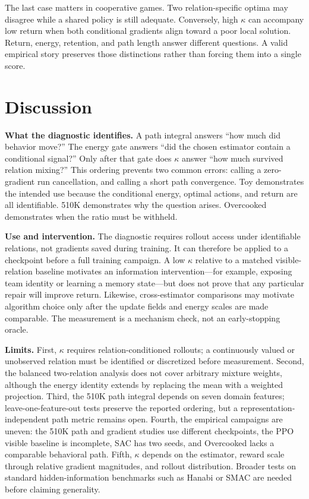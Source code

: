 \documentclass[letterpaper]{article}
\begin{document}
The last case matters in cooperative games.
Two relation-specific optima may disagree while a shared policy is still adequate.
Conversely, high $\kappa$ can accompany low return when both conditional gradients align toward a poor local solution.
Return, energy, retention, and path length answer different questions.
A valid empirical story preserves those distinctions rather than forcing them into a single score.


\section{Discussion}

\textbf{What the diagnostic identifies.}
A path integral answers ``how much did behavior move?''
The energy gate answers ``did the chosen estimator contain a conditional signal?''
Only after that gate does $\kappa$ answer ``how much survived relation mixing?''
This ordering prevents two common errors: calling a zero-gradient run cancellation, and calling a short path convergence.
Toy demonstrates the intended use because the conditional energy, optimal actions, and return are all identifiable.
510K demonstrates why the question arises.
Overcooked demonstrates when the ratio must be withheld.

\textbf{Use and intervention.}
The diagnostic requires rollout access under identifiable relations, not gradients saved during training.
It can therefore be applied to a checkpoint before a full training campaign.
A low $\kappa$ relative to a matched visible-relation baseline motivates an information intervention---for example, exposing team identity or learning a memory state---but does not prove that any particular repair will improve return.
Likewise, cross-estimator comparisons may motivate algorithm choice only after the update fields and energy scales are made comparable.
The measurement is a mechanism check, not an early-stopping oracle.

\textbf{Limits.}
First, $\kappa$ requires relation-conditioned rollouts; a continuously valued or unobserved relation must be identified or discretized before measurement.
Second, the balanced two-relation analysis does not cover arbitrary mixture weights, although the energy identity extends by replacing the mean with a weighted projection.
Third, the 510K path integral depends on seven domain features; leave-one-feature-out tests preserve the reported ordering, but a representation-independent path metric remains open.
Fourth, the empirical campaigns are uneven: the 510K path and gradient studies use different checkpoints, the PPO visible baseline is incomplete, SAC has two seeds, and Overcooked lacks a comparable behavioral path.
Fifth, $\kappa$ depends on the estimator, reward scale through relative gradient magnitudes, and rollout distribution.
Broader tests on standard hidden-information benchmarks such as Hanabi or SMAC are needed before claiming generality.
\end{document}
